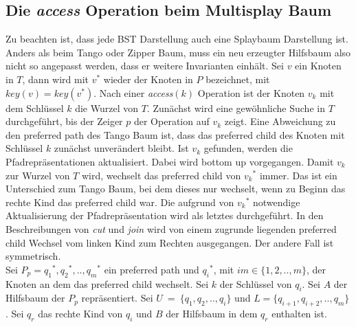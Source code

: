 \documentclass[a4paper,12pt]{article}
\begin{document}
 \subsection{Die \textit{access} Operation beim Multisplay Baum}
 Zu beachten ist, dass jede BST Darstellung auch eine Splaybaum Darstellung ist. Anders als beim Tango oder Zipper Baum, muss ein neu erzeugter Hilfsbaum also nicht so angepasst werden, dass er weitere Invarianten einhält.  Sei $v$ ein Knoten in $T$, dann wird mit $v^*$  wieder der Knoten in $P$ bezeichnet, mit $\mathit{key}\left(v\right) = \mathit{key}\left(v^*\right)$.  Nach einer \textit{access}$\left(k\right)$ Operation ist der Knoten $v_k$ mit dem Schlüssel $k$ die Wurzel von $T$. Zunächst wird eine gewöhnliche Suche in $T$ durchgeführt, bis der Zeiger $p$ der Operation auf $v_k$ zeigt. Eine Abweichung zu den preferred path des Tango Baum ist, dass das preferred child des Knoten mit Schlüssel $k$ zunächst unverändert bleibt. Ist $v_k$ gefunden, werden die Pfadrepräsentationen aktualisiert. Dabei wird bottom up vorgegangen. Damit $v_k$ zur Wurzel von $T$ wird, wechselt das preferred child von ${v_k}^*$ immer. Das ist ein Unterschied zum Tango Baum, bei dem dieses nur wechselt, wenn zu Beginn das rechte Kind das preferred child war. Die aufgrund von ${v_k}^*$ notwendige Aktualisierung der Pfadrepräsentation wird als letztes durchgeführt. In den Beschreibungen von \textit{cut} und \textit{join} wird von einem zugrunde liegenden preferred child Wechsel vom linken Kind zum Rechten ausgegangen. Der andere Fall ist symmetrisch.\\ 
 \noindent Sei $P_p = {q_1}^*, {q_2}^*,.., {q_m}^*$ ein preferred path und ${q_i}^*$, mit $i m\in \{1, 2,..,m\}$, der Knoten  an dem das preferred child wechselt. Sei $k$ der Schlüssel von $q_i$. Sei $A$ der Hilfsbaum der $P_p$ repräsentiert. Sei $U~=~\{q_1, q_2,.., q_i\}$  und $L= \{q_{i+1}, q_{i+2},..,q_m\}$.  Sei $q_r$ das rechte Kind von $q_i$ und $B$ der Hilfsbaum in dem $q_r$ enthalten ist.
 


 
\end{document}
